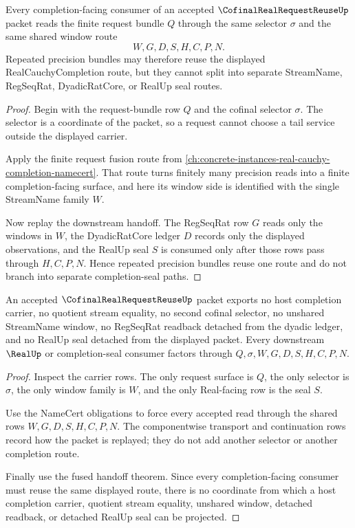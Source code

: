 \begin{theorem}
\label{thm:cofinal-real-request-reuse-fused-handoff}
Every completion-facing consumer of an accepted $\CofinalRealRequestReuseUp$ packet reads the finite request bundle $Q$ through the same selector $\sigma$ and the same shared window route
$$
W,G,D,S,H,C,P,N.
$$
Repeated precision bundles may therefore reuse the displayed RealCauchyCompletion route, but they cannot split into separate StreamName, RegSeqRat, DyadicRatCore, or RealUp seal routes.
\end{theorem}
\begin{proof}
Begin with the request-bundle row $Q$ and the cofinal selector $\sigma$. The selector is a coordinate of the packet, so a request cannot choose a tail service outside the displayed carrier.

Apply the finite request fusion route from \autoref{ch:concrete-instances-real-cauchy-completion-namecert}. That route turns finitely many precision reads into a finite completion-facing surface, and here its window side is identified with the single StreamName family $W$.

Now replay the downstream handoff. The RegSeqRat row $G$ reads only the windows in $W$, the DyadicRatCore ledger $D$ records only the displayed observations, and the RealUp seal $S$ is consumed only after those rows pass through $H,C,P,N$. Hence repeated precision bundles reuse one route and do not branch into separate completion-seal paths.
\end{proof}

\begin{theorem}
\label{thm:cofinal-real-request-reuse-nonescape}
An accepted $\CofinalRealRequestReuseUp$ packet exports no host completion carrier, no quotient stream equality, no second cofinal selector, no unshared StreamName window, no RegSeqRat readback detached from the dyadic ledger, and no RealUp seal detached from the displayed packet. Every downstream $\RealUp$ or completion-seal consumer factors through $Q,\sigma,W,G,D,S,H,C,P,N$.
\end{theorem}
\begin{proof}
Inspect the carrier rows. The only request surface is $Q$, the only selector is $\sigma$, the only window family is $W$, and the only Real-facing row is the seal $S$.

Use the NameCert obligations to force every accepted read through the shared rows $W,G,D,S,H,C,P,N$. The componentwise transport and continuation rows record how the packet is replayed; they do not add another selector or another completion route.

Finally use the fused handoff theorem. Since every completion-facing consumer must reuse the same displayed route, there is no coordinate from which a host completion carrier, quotient stream equality, unshared window, detached readback, or detached RealUp seal can be projected.
\end{proof}

